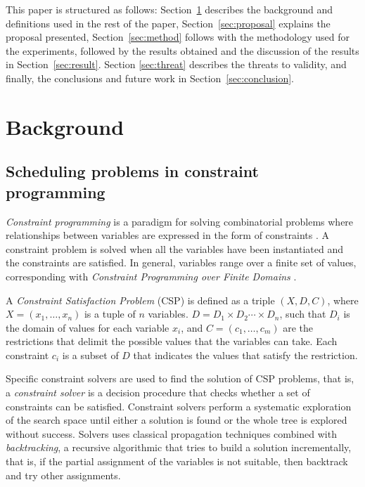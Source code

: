 This paper is structured as follows: Section~\ref{sec:backg} describes the background and definitions used in the rest of the paper, Section~\ref{sec:proposal} explains the proposal presented, Section~\ref{sec:method} follows with the methodology used for the experiments, followed by the results obtained and the discussion of the results in Section~\ref{sec:result}. Section \ref{sec:threat} describes the threats to validity, and finally, the conclusions and future work in Section~\ref{sec:conclusion}.


\section{Background}
\label{sec:backg}


\subsection{Scheduling problems in constraint programming}

\textit{Constraint programming} is a paradigm for solving combinatorial problems where relationships between variables are expressed in the form of constraints \citep{rbw06}.
A constraint problem is solved when all the variables have been instantiated and the constraints are satisfied. In general, variables range over a finite set of values, corresponding with \textit{Constraint Programming over Finite Domains} \cite{schulte2006finite}.


\begin{definition}
  A \textit{Constraint Satisfaction Problem}
  \citep{guns2017miningzinc} (CSP) is defined as a triple
  $( X, D, C)$, where $X=(x_{1},\dots ,x_{n})$ is a tuple of $n$
  variables.  $D=D_{1}\times D_{2}\cdots \times D_{n}$, such that
  $D_i$ is the domain of values for each variable $x_i$, and
  $C=(c_{1},\dots ,c_{m})$ are the restrictions that delimit the
  possible values that the variables can take.  Each constraint
  $c_{i}$ is a subset of $D$ that indicates the values that satisfy
  the restriction.
\end{definition}



Specific constraint solvers are used to find the solution of CSP problems, that is, a \textit{constraint solver} is a decision procedure that checks whether a set of constraints can be satisfied.
Constraint solvers perform a systematic exploration of the search space until either a solution is found or the whole tree is explored without success.
Solvers uses classical propagation techniques \citep{van89} combined with {\em backtracking},
a recursive algorithmic that tries to build a solution incrementally, that is, if the partial assignment of the variables is not suitable, then backtrack and try other assignments.


